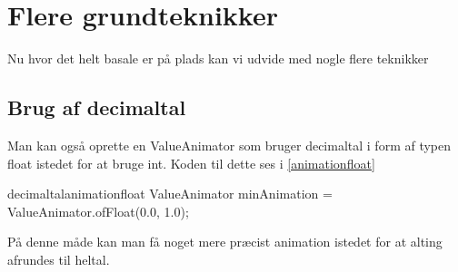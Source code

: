 \section{Flere grundteknikker}
Nu hvor det helt basale er på plads kan vi udvide med nogle flere teknikker
\subsection{Brug af decimaltal}
Man kan også oprette en ValueAnimator som bruger decimaltal i form af typen float istedet for at bruge int. Koden til dette ses i \autoref{animationfloat}
\begin{JavaCode}{decimaltal}{animationfloat}
	ValueAnimator minAnimation = ValueAnimator.ofFloat(0.0, 1.0);
\end{JavaCode}
På denne måde kan man få noget mere præcist animation istedet for at alting afrundes til heltal.

